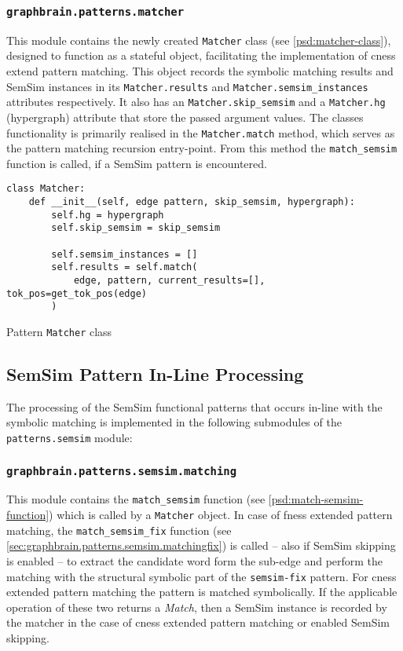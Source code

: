 \documentclass[11pt, numbers=noenddot]{scrreprt}
\begin{document}
\subsubsection{\texttt{graphbrain.patterns.matcher}}
\label{sec:graphbrain.patterns.matcher}
This module contains the newly created \texttt{Matcher} class (see \cref{psd:matcher-class}), designed to function as a stateful object, facilitating the implementation of \gls{cness} extend pattern matching. This object records the symbolic matching results and SemSim instances in its \texttt{Matcher.results} and \texttt{Matcher.semsim\_instances} attributes respectively. It also has an \texttt{Matcher.skip\_semsim} and a \texttt{Matcher.hg} (hypergraph) attribute that store the passed argument values. The classes functionality is primarily realised in the \texttt{Matcher.match} method, which serves as the pattern matching recursion entry-point. From this method the \texttt{match\_semsim} function is called, if a SemSim pattern is encountered.


\begin{pseudo}
\begin{lstlisting}
class Matcher:
    def __init__(self, edge pattern, skip_semsim, hypergraph):
        self.hg = hypergraph
        self.skip_semsim = skip_semsim

        self.semsim_instances = []
        self.results = self.match(
            edge, pattern, current_results=[], tok_pos=get_tok_pos(edge)
        )
\end{lstlisting}
\caption{Pattern \texttt{Matcher} class}
\label{psd:matcher-class}
\end{pseudo}


\subsection{SemSim Pattern In-Line Processing}
The processing of the SemSim functional patterns that occurs in-line with the symbolic matching is implemented in the following submodules of the \texttt{patterns.semsim} module:


\subsubsection{\texttt{graphbrain.patterns.semsim.matching}}
This module contains the \texttt{match\_semsim} function (see \cref{psd:match-semsim-function}) which is called by a \texttt{Matcher} object. In case of \gls{fness} extended pattern matching, the \texttt{match\_semsim\_fix} function (see \cref{sec:graphbrain.patterns.semsim.matchingfix}) is called -- also if SemSim skipping is enabled -- to extract the candidate word form the sub-edge and perform the matching with the structural symbolic part of the \texttt{semsim-fix} pattern. For \gls{cness} extended pattern matching the pattern is matched symbolically. If the applicable operation of these two returns a \textit{Match}, then a SemSim instance is recorded by the matcher in the case of \gls{cness} extended pattern matching or enabled SemSim skipping.
\end{document}
